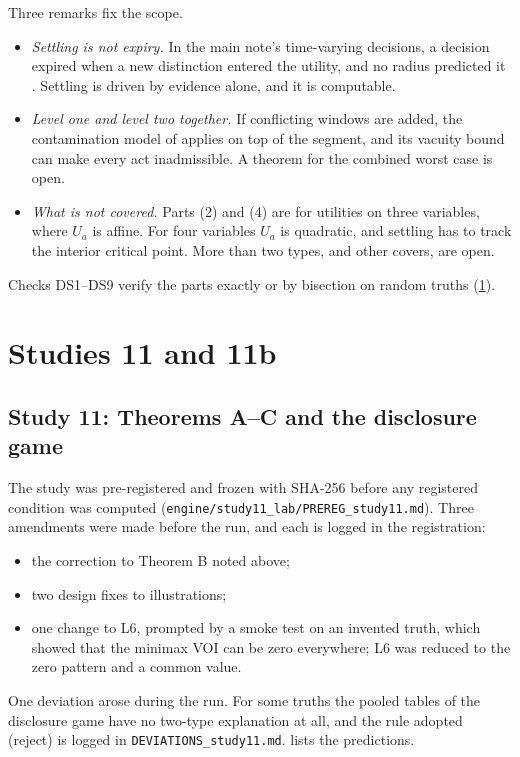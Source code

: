 \documentclass[11pt]{article}
\theoremstyle{definition}\newtheorem{definition}{Definition}\newtheorem{remark}{Remark}
\begin{document}
Three remarks fix the scope.
\begin{itemize}
\item \emph{Settling is not expiry.} In the main note's time-varying decisions, a decision expired when a new distinction entered the
  utility, and no radius predicted it \cite[Section~17]{PG}. Settling is driven by evidence alone, and it is computable.
\item \emph{Level one and level two together.} If conflicting windows are added, the contamination model of \cite{PG} applies on top
  of the segment, and its vacuity bound \cite[Prop.~36]{PG} can make every act inadmissible. A theorem for the combined worst case is
  open.
\item \emph{What is not covered.} Parts (2) and (4) are for utilities on three variables, where $U_a$ is affine. For four variables
  $U_a$ is quadratic, and settling has to track the interior critical point. More than two types, and other covers, are open.
\end{itemize}
Checks DS1--DS9 verify the parts exactly or by bisection on random truths (\cref{sec:lab}).

\section{Studies 11 and 11b}\label{sec:lab}
\subsection*{Study 11: Theorems A--C and the disclosure game}
The study was pre-registered and frozen with SHA-256 before any registered condition was computed
(\texttt{engine/study11\_lab/PREREG\_study11.md}). Three amendments were made before the run, and each is logged in the registration:
\begin{itemize}
\item the correction to Theorem B noted above;
\item two design fixes to illustrations;
\item one change to L6, prompted by a smoke test on an invented truth, which showed that the minimax VOI can be zero everywhere; L6
  was reduced to the zero pattern and a common value.
\end{itemize}
One deviation arose during the run. For some truths the pooled tables of the disclosure game have no two-type explanation at all, and
the rule adopted (reject) is logged in \texttt{DEVIATIONS\_study11.md}.  lists the predictions.
\end{document}
